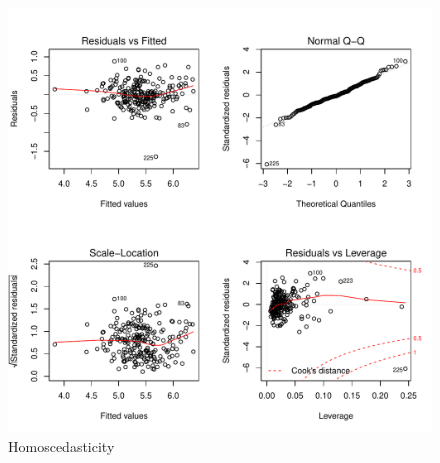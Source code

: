 \documentclass{article}\usepackage[]{graphicx}\usepackage[]{color}
\makeatletter
\def\maxwidth{ %
  \ifdim\Gin@nat@width>\linewidth
    \linewidth
  \else
    \Gin@nat@width
  \fi
}
\newenvironment{knitrout}{}{} %
\makeatother
\begin{document}
\begin{figure}
\begin{center}
\caption{Homoscedasticity}
\label{residuals}
\begin{knitrout}
\color{fgcolor}
\includegraphics[width=\maxwidth]{figure/Homoscedasticity-1} 

\end{knitrout}
\end{center}
\end{figure}
%
\end{document}
